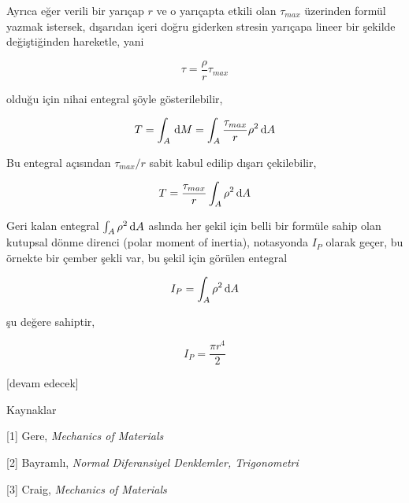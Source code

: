 \documentclass[12pt,fleqn]{article}\usepackage{../../common}
\begin{document}
Ayrıca eğer verili bir yarıçap $r$ ve o yarıçapta etkili olan $\tau_{max}$
üzerinden formül yazmak istersek, dışarıdan içeri doğru giderken stresin
yarıçapa lineer bir şekilde değiştiğinden hareketle, yani

$$
\tau = \frac{\rho}{r} \tau_{max}
$$

olduğu için nihai entegral şöyle gösterilebilir,

$$
T = \int_A \,\mathrm{d} M = \int_A \frac{\tau_{max}}{r} \rho^2 \,\mathrm{d} A
$$

Bu entegral açısından $\tau_{max} / r$ sabit kabul edilip dışarı çekilebilir,

$$
T = \frac{\tau_{max}}{r} \int_A \rho^2 \,\mathrm{d} A
$$

Geri kalan entegral $\int_A \rho^2 \,\mathrm{d} A$ aslında her şekil için belli bir
formüle sahip olan kutupsal dönme direnci (polar moment of inertia), notasyonda
$I_P$ olarak geçer, bu örnekte bir çember şekli var, bu şekil için görülen
entegral

$$
I_P = \int_A \rho^2 \,\mathrm{d} A
$$

şu değere sahiptir,

$$
I_P = \frac{\pi r^4}{2} 
$$


[devam edecek]

Kaynaklar

[1] Gere, {\em Mechanics of Materials}

[2] Bayramlı, {\em Normal Diferansiyel Denklemler, Trigonometri}

[3] Craig, {\em Mechanics of Materials}
\end{document}
